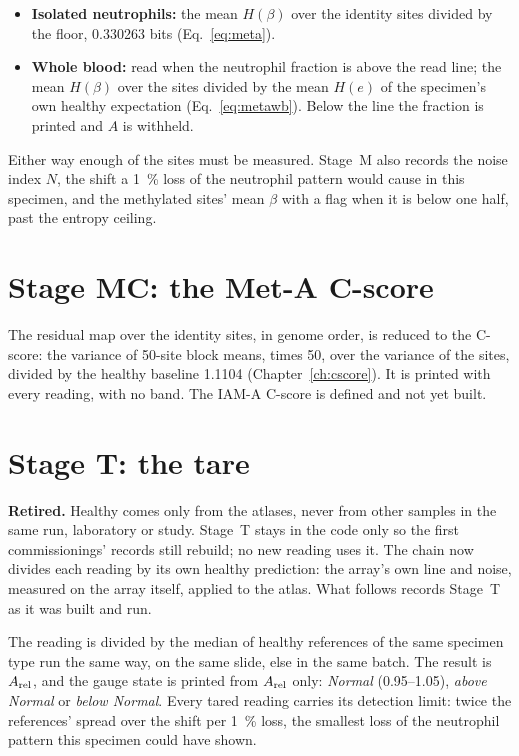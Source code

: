 \begin{itemize}
\item \textbf{Isolated neutrophils:} the mean $H(\beta)$ over the identity sites divided by the floor, 0.330263 bits (Eq.~\eqref{eq:meta}).
\item \textbf{Whole blood:} read when the neutrophil fraction is above the read line; the mean $H(\beta)$ over the sites divided by the mean $H(e)$ of the specimen's
      own healthy expectation (Eq.~\eqref{eq:metawb}). Below the line the fraction is printed and $A$ is withheld.
\end{itemize}
Either way enough of the sites must be measured. Stage~M also records the noise index $N$, the shift a 1~\% loss of the neutrophil pattern would cause in
this specimen, and the methylated sites' mean $\beta$ with a flag when it is below one half, past the entropy ceiling.

\section{Stage MC: the Met-A C-score}

The residual map over the identity sites, in genome order, is reduced to the C-score: the variance of 50-site block means, times 50, over the variance of the sites,
divided by the healthy baseline 1.1104 (Chapter~\ref{ch:cscore}). It is printed with every reading, with no band. The IAM-A C-score is defined and not yet built. \openprob

\section{Stage T: the tare}

\textbf{Retired.} Healthy comes only from the atlases, never from other samples in the same run, laboratory or study. Stage~T stays in the code only so the first commissionings' records still rebuild; no new reading uses it. The chain now divides each reading by its own healthy prediction: the array's own line and noise, measured on the array itself, applied to the atlas. What follows records Stage~T as it was built and run.

The reading is divided by the median of healthy references of the same specimen type run the same way, on the same slide, else in the same batch.
The result is $A_{\rm rel}$, and the gauge state is printed from $A_{\rm rel}$ only: \emph{Normal} (0.95--1.05), \emph{above Normal} or \emph{below Normal}. Every
tared reading carries its detection limit: twice the references' spread over the shift per 1~\% loss, the smallest loss of the neutrophil pattern this specimen
could have shown.

